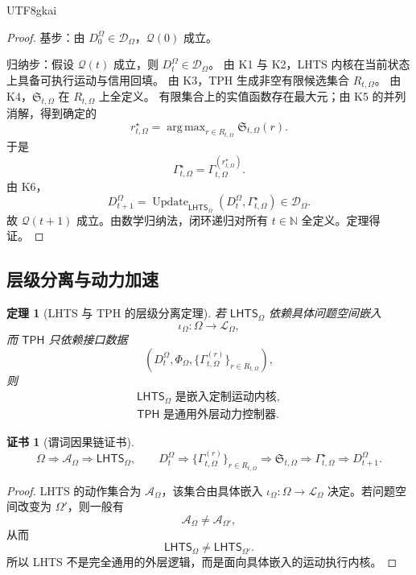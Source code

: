 \documentclass[12pt]{article}
\newtheorem{theorem}{定理}[section]
\newtheorem{Certificate}{证书}[section]
\newcommand{\NN}{\mathbb{N}}
\newcommand{\LHTS}{\ensuremath{\mathsf{LHTS}}}
\newcommand{\TPH}{\ensuremath{\mathsf{TPH}}}
\DeclareMathOperator{\Update}{Update}
\DeclareMathOperator*{\argmax}{arg\,max}
\begin{document}
\begin{CJK*}{UTF8}{gkai}
\begin{proof}
基步：由 \(D_0^\Omega\in\mathcal D_\Omega\)，\(\mathcal Q(0)\) 成立。

归纳步：假设 \(\mathcal Q(t)\) 成立，则 \(D_t^\Omega\in\mathcal D_\Omega\)。
由 K1 与 K2，LHTS 内核在当前状态上具备可执行运动与信用回填。
由 K3，TPH 生成非空有限候选集合 \(R_{t,\Omega}\)。
由 K4，\(\mathfrak S_{t,\Omega}\) 在 \(R_{t,\Omega}\) 上全定义。
有限集合上的实值函数存在最大元；由 K5 的并列消解，得到确定的
\[
r_{t,\Omega}^\star
=
\argmax_{r\in R_{t,\Omega}}\mathfrak S_{t,\Omega}(r).
\]
于是
\[
\Gamma_{t,\Omega}^\star
=
\Gamma_{t,\Omega}^{(r_{t,\Omega}^\star)}.
\]
由 K6，
\[
D_{t+1}^\Omega
=
\Update_{\LHTS_\Omega}(D_t^\Omega,\Gamma_{t,\Omega}^\star)
\in\mathcal D_\Omega.
\]
故 \(\mathcal Q(t+1)\) 成立。由数学归纳法，闭环递归对所有
\(t\in\NN\) 全定义。定理得证。
\end{proof}

\subsection{层级分离与动力加速}
\label{subsec:hierarchy-separation-acceleration}

\begin{theorem}[LHTS 与 TPH 的层级分离定理]
若 \(\LHTS_\Omega\) 依赖具体问题空间嵌入
\[
\iota_\Omega:\Omega\to\mathcal L_\Omega,
\]
而 \(\TPH\) 只依赖接口数据
\[
(D_t^\Omega,\Phi_\Omega,\{\Gamma_{t,\Omega}^{(r)}\}_{r\in R_{t,\Omega}}),
\]
则
\[
\boxed{
\begin{gathered}
\LHTS_\Omega
\text{ 是嵌入定制运动内核},
\\
\TPH
\text{ 是通用外层动力控制器}.
\end{gathered}
}
\]
\end{theorem}

\begin{Certificate}[谓词因果链证书]
\[
\boxed{
\Omega
\Rightarrow
\mathcal A_\Omega
\Rightarrow
\LHTS_\Omega,
\qquad
D_t^\Omega
\Rightarrow
\{\Gamma_{t,\Omega}^{(r)}\}_{r\in R_{t,\Omega}}
\Rightarrow
\mathfrak S_{t,\Omega}
\Rightarrow
\Gamma_{t,\Omega}^\star
\Rightarrow
D_{t+1}^\Omega.
}
\]
\end{Certificate}

\begin{proof}
LHTS 的动作集合为 \(\mathcal A_\Omega\)，该集合由具体嵌入
\(\iota_\Omega:\Omega\to\mathcal L_\Omega\) 决定。若问题空间改变为
\(\Omega'\)，则一般有
\[
\mathcal A_\Omega\ne\mathcal A_{\Omega'},
\]
从而
\[
\LHTS_\Omega\ne\LHTS_{\Omega'}.
\]
所以 LHTS 不是完全通用的外层逻辑，而是面向具体嵌入的运动执行内核。


\end{proof}
\end{CJK*}
\end{document}
